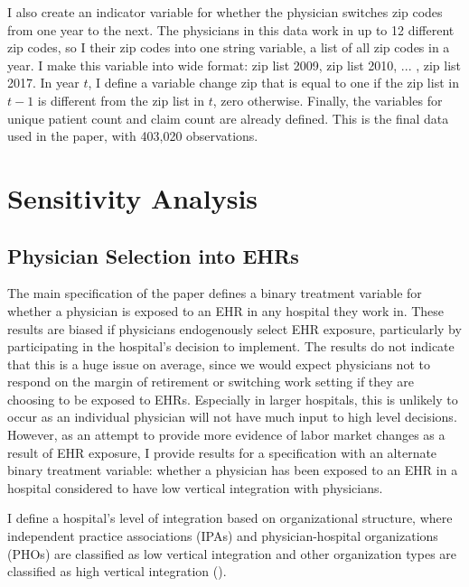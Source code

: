 \documentclass[11pt]{article}
\begin{document}
I also create an indicator variable for whether the physician switches zip codes from one year to the next. The physicians in this data work in up to 12 different zip codes, so I their zip codes into one string variable, a list of all zip codes in a year. I make this variable into wide format: zip list 2009, zip list 2010, ... , zip list 2017.  In year $t$, I define a variable change zip that is equal to one if the zip list in $t-1$ is different from the zip list in $t$, zero otherwise. Finally, the variables for unique patient count and claim count are already defined. This is the final data used in the paper, with 403,020 observations. 



\section{Sensitivity Analysis}

\subsection{Physician Selection into EHRs}\label{sec:endog}

The main specification of the paper defines a binary treatment variable for whether a physician is exposed to an EHR in any hospital they work in. These results are biased if physicians endogenously select EHR exposure, particularly by participating in the hospital's decision to implement. The results do not indicate that this is a huge issue on average, since we would expect physicians not to respond on the margin of retirement or switching work setting if they are choosing to be exposed to EHRs. Especially in larger hospitals, this is unlikely to occur as an individual physician will not have much input to high level decisions. However, as an attempt to provide more evidence of labor market changes as a result of EHR exposure, I provide results for a specification with an alternate binary treatment variable: whether a physician has been exposed to an EHR in a hospital considered to have low vertical integration with physicians. 

I define a hospital's level of integration based on organizational structure, where independent practice associations (IPAs) and physician-hospital organizations (PHOs) are classified as low vertical integration and other organization types are classified as high vertical integration (\cite{dynan1998assessing}). 
\end{document}

